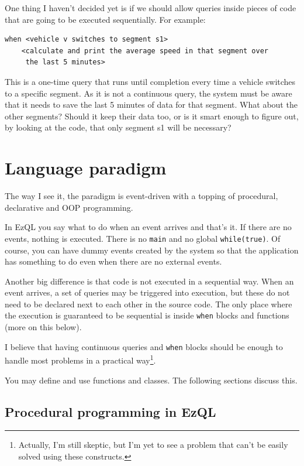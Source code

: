 \documentclass{report}
\begin{document}
One thing I haven't decided yet is if we should allow queries inside
pieces of code that are going to be executed sequentially. For
example:

\begin{verbatim}
when <vehicle v switches to segment s1>
    <calculate and print the average speed in that segment over
     the last 5 minutes>
\end{verbatim}

This is a one-time query that runs until completion every time a
vehicle switches to a specific segment. As it is not a continuous
query, the system must be aware that it needs to save the last 5
minutes of data for that segment. What about the other segments?
Should it keep their data too, or is it smart enough to figure out, by
looking at the code, that only segment s1 will be necessary?

\chapter{Language paradigm}
The way I see it, the paradigm is event-driven with a topping of
procedural, declarative and OOP programming.

In EzQL you say what to do when an event arrives and that's it. If
there are no events, nothing is executed. There is no \verb=main= and
no global \verb=while(true)=. Of course, you can have dummy events
created by the system so that the application has something to do even
when there are no external events.

Another big difference is that code is not executed in a sequential
way. When an event arrives, a set of queries may be triggered into
execution, but these do not need to be declared next to each other in
the source code. The only place where the execution is guaranteed to
be sequential is inside \verb=when= blocks and functions (more on this
below).

I believe that having continuous queries and \verb=when= blocks should
be enough to handle most problems in a practical
way\footnote{Actually, I'm still skeptic, but I'm yet to see a problem
  that can't be easily solved using these constructs.}.

You may define and use functions and classes. The following sections
discuss this.

\section{Procedural programming in EzQL}
\end{document}

